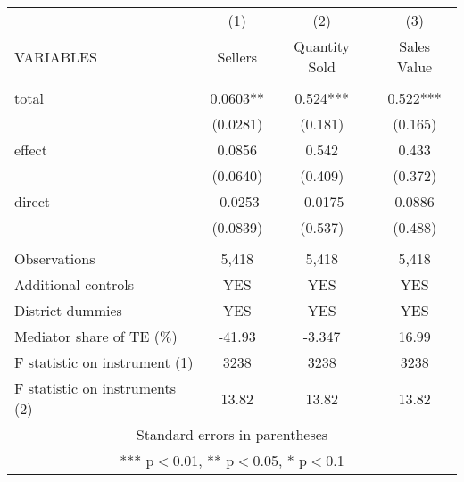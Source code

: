 \documentclass[]{article}
\begin{document}
\begin{tabular}{lccc} \hline
 & (1) & (2) & (3) \\
VARIABLES & Sellers & Quantity Sold & Sales Value \\ \hline
 &  &  &  \\
total & 0.0603** & 0.524*** & 0.522*** \\
 & (0.0281) & (0.181) & (0.165) \\
effect & 0.0856 & 0.542 & 0.433 \\
 & (0.0640) & (0.409) & (0.372) \\
direct & -0.0253 & -0.0175 & 0.0886 \\
 & (0.0839) & (0.537) & (0.488) \\
 &  &  &  \\
Observations & 5,418 & 5,418 & 5,418 \\
Additional controls & YES & YES & YES \\
District dummies & YES & YES & YES \\
Mediator share of TE (\%) & -41.93 & -3.347 & 16.99 \\
F statistic on instrument (1) & 3238 & 3238 & 3238 \\
 F statistic on instruments (2) & 13.82 & 13.82 & 13.82 \\ \hline
\multicolumn{4}{c}{ Standard errors in parentheses} \\
\multicolumn{4}{c}{ *** p$<$0.01, ** p$<$0.05, * p$<$0.1} \\
\end{tabular}
\end{document}
